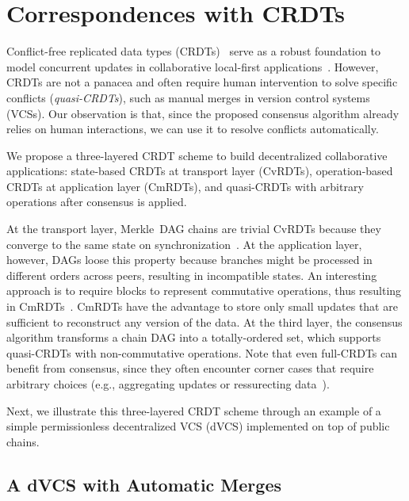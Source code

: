 \documentclass[12pt]{article}
\begin{document}
\section{Correspondences with CRDTs}
\label{sec.crdts}

Conflict-free replicated data types (CRDTs)~\cite{p2p.crdts} serve as a robust
foundation to model concurrent updates in collaborative local-first
applications~\cite{p2p.local}.
However, CRDTs are not a panacea and often require human intervention to solve
specific conflicts (\emph{quasi-CRDTs}), such as manual merges in version
control systems (VCSs).
%
Our observation is that, since the proposed consensus algorithm already relies
on human interactions, we can use it to resolve conflicts automatically.

We propose a three-layered CRDT scheme to build decentralized collaborative
applications:
    state-based CRDTs at transport layer (CvRDTs),
    operation-based CRDTs at application layer (CmRDTs), and
    quasi-CRDTs with arbitrary operations after consensus is applied.

At the transport layer, Merkle~DAG chains are trivial CvRDTs because they
converge to the same state on synchronization~\cite{p2p.merkle-crdts}.
%
At the application layer, however, DAGs loose this property because branches
might be processed in different orders across peers, resulting in incompatible
states.
An interesting approach is to require blocks to represent commutative
operations, thus resulting in CmRDTs~\cite{p2p.merkle-crdts}.
%
CmRDTs have the advantage to store only small updates that are sufficient to
reconstruct any version of the data.
%
At the third layer, the consensus algorithm transforms a chain DAG into a
totally-ordered set, which supports quasi-CRDTs with non-commutative
operations.
Note that even full-CRDTs can benefit from consensus, since they often
encounter corner cases that require arbitrary choices (e.g., aggregating
updates or ressurecting data~\cite{p2p.automerge}).

Next, we illustrate this three-layered CRDT scheme through an example of a
simple permissionless decentralized VCS (dVCS) implemented on top of public
chains.

\subsection{A dVCS with Automatic Merges}
\end{document}
